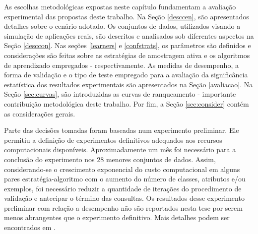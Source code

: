 As escolhas metodológicas expostas neste capítulo fundamentam a avaliação experimental das propostas deste trabalho.
Na Seção \ref{desccen}, são apresentados detalhes sobre o cenário adotado.
Os conjuntos de dados, utilizados visando a simulação de aplicações reais, são descritos e analisados sob diferentes aspectos na Seção \ref{desccon}.
Nas seções \ref{learners} e \ref{confstrats}, os parâmetros são definidos e considerações são feitas sobre as estratégias de amostragem ativa e os algoritmos de aprendizado empregados - respectivamente.
As medidas de desempenho, a forma de validação e o tipo de teste empregado para a avaliação da significância estatística dos resultados experimentais são apresentados na Seção \ref{avaliacao}.
Na Seção \ref{sec:curvas}, são introduzidas as curvas de ranqueamento - importante contribuição metodológica deste trabalho.
Por fim, a Seção \ref{sec:consider} contém as considerações gerais.
\usetikzlibrary{trees}

Parte das decisões tomadas foram baseadas num experimento preliminar.
Ele permitiu a definição de experimentos definitivos adequados aos recursos computacionais disponíveis.
Aproximadamente um mês foi necessário para a conclusão do experimento nos 28 menores conjuntos de dados.
Assim, considerando-se o crescimento exponencial do custo computacional em alguns pares estratégia-algoritmo com o aumento do número de classes, atributos e/ou exemplos, foi necessário reduzir a quantidade de iterações do procedimento de validação e antecipar o término das consultas.
Os resultados desse experimento preliminar com relação a desempenho não são reportados nesta tese por serem menos abrangentes que o experimento definitivo.
Mais detalhes podem ser encontrados em .


